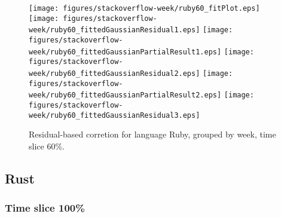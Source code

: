 \begin{figure}[hb]
\centering
{}
{\texttt{[image: figures/stackoverflow-week/ruby60\_fitPlot.eps]}}
{\texttt{[image: figures/stackoverflow-week/ruby60\_fittedGaussianResidual1.eps]}}
{\texttt{[image: figures/stackoverflow-week/ruby60\_fittedGaussianPartialResult1.eps]}}
{\texttt{[image: figures/stackoverflow-week/ruby60\_fittedGaussianResidual2.eps]}}
{\texttt{[image: figures/stackoverflow-week/ruby60\_fittedGaussianPartialResult2.eps]}}
{\texttt{[image: figures/stackoverflow-week/ruby60\_fittedGaussianResidual3.eps]}}
\caption{Residual-based corretion for language Ruby, grouped by week, time slice 60\%.}
\end{figure}


\clearpage 
\newpage 


\subsection{Rust}

\FloatBarrier

\subsubsection{Time slice 100\%}


